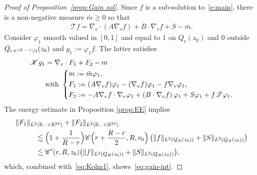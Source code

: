 \documentclass[10pt]{amsart}
\let\mathcal\mathscr
\newcommand{\psfrac}[2]{\sfrac{(#1)}{#2}}
\theoremstyle{definition}
\theoremstyle{remark}
\newcommand\R{{\mathbb R}}
\newcommand{\cC}{\mathcal C}
\newcommand{\cK}{\mathcal K}
\newcommand{\cT}{\mathcal T}
\begin{document}
\begin{proof}[Proof of Proposition~\ref{prop:Gain sol}]
Since $f$ is a sub-solution to~\eqref{e:main}, there is a
non-negative measure $\bar m \ge 0$ so that
\begin{align*}
\cT f =\nabla_v\cdot (A\nabla_v f) + B \cdot \nabla_v f
+ S - \bar m.
\end{align*}
Consider $\varphi_1$ smooth valued in $[0,1]$ and equal to $1$
on $Q_r(z_0)$ and $0$ outside $Q_{r+\psfrac{R-r}{2}}(z_0)$ and
$g_1:=\varphi_1 f$. The latter satisfies
\begin{equation}
\label{eq:ineqKg}
\begin{aligned}
\cK g_1 &= \nabla_v \cdot F_1+F_2 - m \\
&\text{with }
\begin{dcases}
m:= \bar m \varphi_1, \\
F_1 := (A\nabla_v f) \varphi_1-(\nabla_v
f) \varphi_1 - f \nabla_v \varphi_1, \\
F_2:= -A\nabla_v f\cdot \nabla_v \varphi_1+ \left( B
\cdot \nabla_v f \right)\varphi_1 + S\varphi_1 + f \cT
\varphi_1.
\end{dcases}
\end{aligned}
\end{equation}
The energy estimate in Proposition \ref{prop:EE} implies
\begin{align*}
& \| F_1 \|_{L^2(\R_- \times \R^{2d})} + \| F_2 \|_{L^2(\R_-
\times \R^{2d})} \\
& \hspace{1cm} \lesssim \Bigl( 1+\frac{1}{R-r} \Bigr)
\cC\Bigl(r+\frac{R-r}{2}, R,v_0\Bigr)
\left( \| f \|_{L^2\left(Q_R(z_0)\right)}
+ \| S \|_{L^2(Q_R(z_0))} \right) \\
& \hspace{1cm} \lesssim \cC'(r,R,z_0) \bigl( \| f
\|_{L^2(Q_R(z_0))} + \| S \|_{L^2(Q_R(z_0))} \bigr),
\end{align*}
which, combined with~\eqref{eq:Kolm1},
shows~\eqref{eq:gain-int}.


\end{proof}
\end{document}
